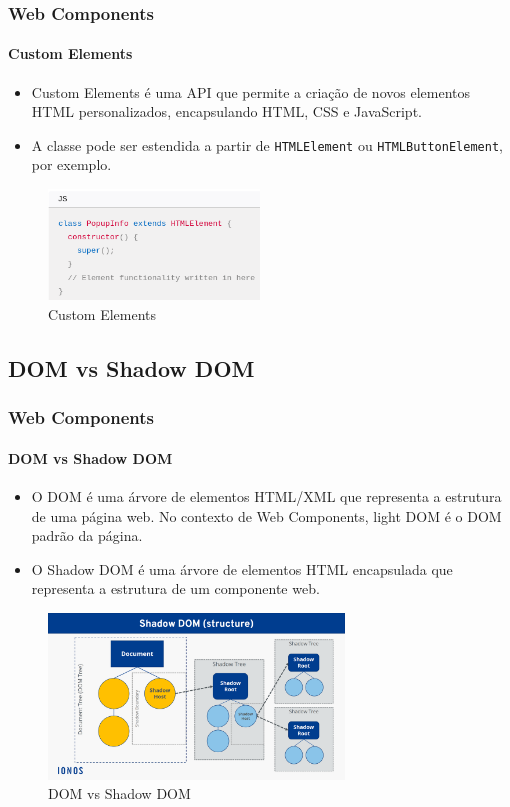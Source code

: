 \documentclass[
	9pt, %
	t, %
]{beamer}
\begin{document}
\begin{frame}
	\frametitle{Web Components}
	\framesubtitle{Custom Elements}
	\begin{itemize}
		\item Custom Elements é uma API que permite a criação de novos elementos HTML personalizados, encapsulando HTML, CSS e JavaScript.
		\item A classe pode ser estendida a partir de \texttt{HTMLElement} ou \texttt{HTMLButtonElement}, por exemplo.
	\end{itemize}

	\begin{figure}
		\centering
		\includegraphics[width=0.5\textwidth]{custom_elements.png}
		\caption{Custom Elements}
	\end{figure}

\end{frame}

\subsection{DOM vs Shadow DOM}

\begin{frame}
	\frametitle{Web Components}
	\framesubtitle{DOM vs Shadow DOM}
	\begin{itemize}
		\item O DOM é uma árvore de elementos HTML/XML que representa a estrutura de uma página web. No contexto de Web Components, light DOM é o DOM padrão da página.
		\item O Shadow DOM é uma árvore de elementos HTML encapsulada que representa a estrutura de um componente web.
	\end{itemize}

	\begin{figure}
		\centering
		\includegraphics[width=0.7\textwidth]{dom_shadow_dom.png}
		\caption{DOM vs Shadow DOM}
	\end{figure}

\end{frame}
\end{document}
